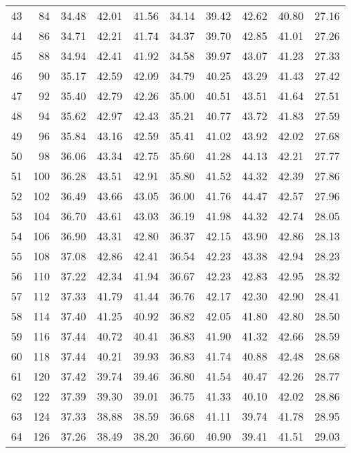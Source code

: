 \begin{longtable}{rrllllllll}
		43 & 84 & 34.48 & 42.01 & 41.56 & 34.14 & 39.42 & 42.62 & 40.80 & 27.16 \\ 
		44 & 86 & 34.71 & 42.21 & 41.74 & 34.37 & 39.70 & 42.85 & 41.01 & 27.26 \\ 
		45 & 88 & 34.94 & 42.41 & 41.92 & 34.58 & 39.97 & 43.07 & 41.23 & 27.33 \\ 
		46 & 90 & 35.17 & 42.59 & 42.09 & 34.79 & 40.25 & 43.29 & 41.43 & 27.42 \\ 
		47 & 92 & 35.40 & 42.79 & 42.26 & 35.00 & 40.51 & 43.51 & 41.64 & 27.51 \\ 
		48 & 94 & 35.62 & 42.97 & 42.43 & 35.21 & 40.77 & 43.72 & 41.83 & 27.59 \\ 
		49 & 96 & 35.84 & 43.16 & 42.59 & 35.41 & 41.02 & 43.92 & 42.02 & 27.68 \\ 
		50 & 98 & 36.06 & 43.34 & 42.75 & 35.60 & 41.28 & 44.13 & 42.21 & 27.77 \\ 
		51 & 100 & 36.28 & 43.51 & 42.91 & 35.80 & 41.52 & 44.32 & 42.39 & 27.86 \\ 
		52 & 102 & 36.49 & 43.66 & 43.05 & 36.00 & 41.76 & 44.47 & 42.57 & 27.96 \\ 
		53 & 104 & 36.70 & 43.61 & 43.03 & 36.19 & 41.98 & 44.32 & 42.74 & 28.05 \\ 
		54 & 106 & 36.90 & 43.31 & 42.80 & 36.37 & 42.15 & 43.90 & 42.86 & 28.13 \\ 
		55 & 108 & 37.08 & 42.86 & 42.41 & 36.54 & 42.23 & 43.38 & 42.94 & 28.23 \\ 
		56 & 110 & 37.22 & 42.34 & 41.94 & 36.67 & 42.23 & 42.83 & 42.95 & 28.32 \\ 
		57 & 112 & 37.33 & 41.79 & 41.44 & 36.76 & 42.17 & 42.30 & 42.90 & 28.41 \\ 
		58 & 114 & 37.40 & 41.25 & 40.92 & 36.82 & 42.05 & 41.80 & 42.80 & 28.50 \\ 
		59 & 116 & 37.44 & 40.72 & 40.41 & 36.83 & 41.90 & 41.32 & 42.66 & 28.59 \\ 
		60 & 118 & 37.44 & 40.21 & 39.93 & 36.83 & 41.74 & 40.88 & 42.48 & 28.68 \\ 
		61 & 120 & 37.42 & 39.74 & 39.46 & 36.80 & 41.54 & 40.47 & 42.26 & 28.77 \\ 
		62 & 122 & 37.39 & 39.30 & 39.01 & 36.75 & 41.33 & 40.10 & 42.02 & 28.86 \\ 
		63 & 124 & 37.33 & 38.88 & 38.59 & 36.68 & 41.11 & 39.74 & 41.78 & 28.95 \\ 
		64 & 126 & 37.26 & 38.49 & 38.20 & 36.60 & 40.90 & 39.41 & 41.51 & 29.03 \\ 

\end{longtable}
